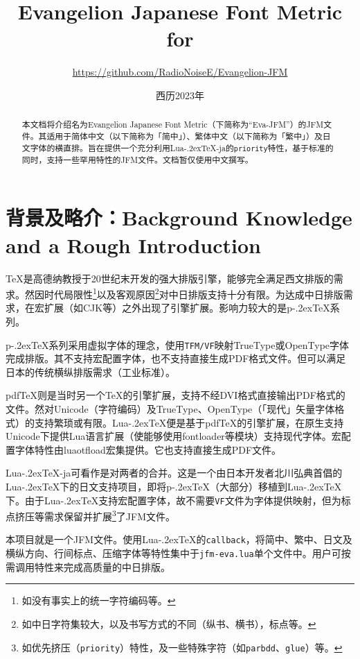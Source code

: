 \documentclass{ltjsarticle}
\title{\sffamily\bfseries Evangelion Japanese Font Metric for \LuaTeX}
\author{\large \url{https://github.com/RadioNoiseE/Evangelion-JFM}}
\date{西历2023年}
\def\段{\par}
\def\LuaTeX{Lua\kern-.2ex\TeX}
\def\pTeX{p\kern-.2ex\TeX}
\def\pdfTeX{pdf\TeX}
\begin{document}
\zw\parskip=2pt

\maketitle

\begin{abstract}
    本文档将介绍名为Evangelion Japanese Font Metric（下简称为``\textsf{Eva-JFM}''）的JFM文件。其适用于简体中文（以下简称为「简中」）、繁体中文（以下简称为「繁中」）及日文字体的横直排。旨在提供一个充分利用\LuaTeX{}-ja的\texttt{priority}特性，基于标准\cite{jlreq}的同时，支持一些罕用特性的JFM文件。文档暂仅使用中文撰写。\段
\end{abstract}

\section{背景及略介：Background Knowledge and a Rough Introduction}
\TeX{}是高德纳教授于20世纪末开发的强大排版引擎，能够完全满足西文排版的需求。然因时代局限性\footnote{如没有事实上的统一字符编码等。}以及客观原因\footnote{如中日字符集较大，以及书写方式的不同（纵书、横书），标点等。}对中日排版支持十分有限。为达成中日排版需求，在宏扩展（如\textsf{CJK}等）之外出现了引擎扩展。影响力较大的是\pTeX{}系列。\段
\pTeX{}系列采用虚拟字体的理念，使用\texttt{TFM/VF}映射TrueType或OpenType字体完成排版。其不支持宏配置字体，也不支持直接生成PDF格式文件。但可以满足日本的传统横纵排版需求（工业标准）。\段
\pdfTeX{}则是当时另一个\TeX{}的引擎扩展，支持不经DVI格式直接输出PDF格式的文件。然对Unicode（字符编码）及TrueType、OpenType（「现代」矢量字体格式）的支持繁琐或有限。\LuaTeX{}便是基于\pdfTeX{}的引擎扩展，在原生支持Unicode下提供Lua语言扩展（使能够使用\textsf{fontloader}等模块）支持现代字体。宏配置字体特性由\textsf{luaotfload}宏集提供。它也支持直接生成PDF文件。\段
\LuaTeX{}-ja可看作是对两者的合并。这是一个由日本开发者北川弘典首倡的\LuaTeX{}下的日文支持项目，即将\pTeX{}（大部分）移植到\LuaTeX{}下。由于\LuaTeX{}支持宏配置字体，故不需要\texttt{VF}文件为字体提供映射，但为标点挤压等需求保留并扩展\footnote{如优先挤压（\texttt{priority}）特性，及一些特殊字符（如\texttt{parbdd}、\texttt{glue}）等。}了JFM文件。\段
本项目就是一个JFM文件。使用\LuaTeX{}的\texttt{callback}，将简中、繁中、日文及横纵方向、行间标点、压缩字体等特性集中于\texttt{jfm-eva.lua}单个文件中。用户可按需调用特性来完成高质量的中日排版。
\end{document}
